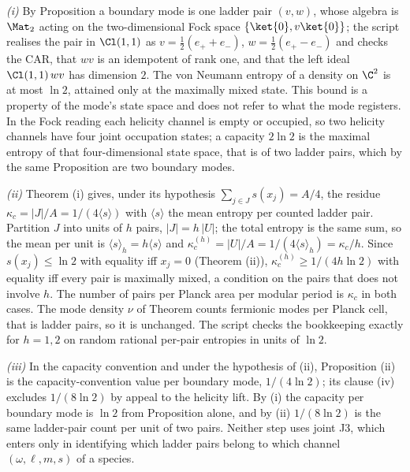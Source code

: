 \emph{(i)} By Proposition  a boundary mode is one ladder pair $(v, w)$, whose algebra is $\Mat_{2}$ acting on the two-dimensional Fock space $\{\ket{0}, v\ket{0}\}$; the script realises the pair in $\Cl(1,1)$ as $v = \tfrac12(e_{+} + e_{-})$, $w = \tfrac12(e_{+} - e_{-})$ and checks the CAR, that $wv$ is an idempotent of rank one, and that the left ideal $\Cl(1,1)\,wv$ has dimension $2$. The von Neumann entropy of a density on $\C^{2}$ is at most $\ln 2$, attained only at the maximally mixed state. This bound is a property of the mode's state space and does not refer to what the mode registers. In the Fock reading each helicity channel is empty or occupied, so two helicity channels have four joint occupation states; a capacity $2\ln 2$ is the maximal entropy of that four-dimensional state space, that is of two ladder pairs, which by the same Proposition are two boundary modes.

\emph{(ii)} Theorem (i) gives, under its hypothesis $\sum_{j \in J}s(x_{j}) = A/4$, the residue $\kappa_{c} = |J|/A = 1/(4\langle s\rangle)$ with $\langle s\rangle$ the mean entropy per counted ladder pair. Partition $J$ into units of $h$ pairs, $|J| = h\,|U|$; the total entropy is the same sum, so the mean per unit is $\langle s\rangle_{h} = h\langle s\rangle$ and $\kappa_{c}^{(h)} = |U|/A = 1/(4\langle s\rangle_{h}) = \kappa_{c}/h$. Since $s(x_{j}) \le \ln 2$ with equality iff $x_{j} = 0$ (Theorem (ii)), $\kappa_{c}^{(h)} \ge 1/(4h\ln 2)$ with equality iff every pair is maximally mixed, a condition on the pairs that does not involve $h$. The number of pairs per Planck area per modular period is $\kappa_{c}$ in both cases. The mode density $\nu$ of Theorem  counts fermionic modes per Planck cell, that is ladder pairs, so it is unchanged. The script checks the bookkeeping exactly for $h = 1, 2$ on random rational per-pair entropies in units of $\ln 2$.

\emph{(iii)} In the capacity convention and under the hypothesis of (ii), Proposition (ii) is the capacity-convention value per boundary mode, $1/(4\ln 2)$; its clause (iv) excludes $1/(8\ln 2)$ by appeal to the helicity lift. By (i) the capacity per boundary mode is $\ln 2$ from Proposition  alone, and by (ii) $1/(8\ln 2)$ is the same ladder-pair count per unit of two pairs. Neither step uses joint J3, which enters only in identifying which ladder pairs belong to which channel $(\omega, \ell, m, s)$ of a species.
